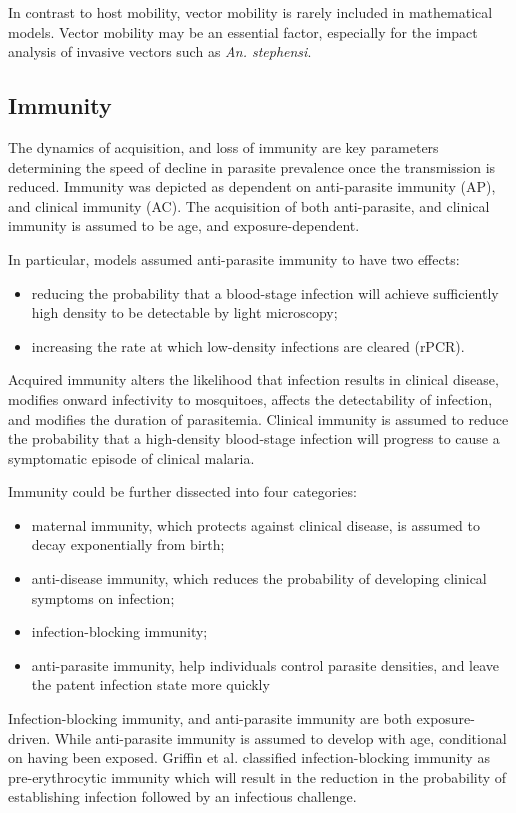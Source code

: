 \documentclass[a4paper, 12pt, twoside]{article}
\begin{document}
In contrast to host mobility, vector mobility is rarely included in mathematical models.
Vector mobility may be an essential factor, especially for the impact analysis of invasive vectors such as \textit{An. stephensi}.

\subsection{Immunity}
The dynamics of acquisition, and loss of immunity are key parameters determining the speed of decline in parasite prevalence once the transmission is reduced.
Immunity was depicted as dependent on anti-parasite immunity (AP), and clinical immunity (AC).
The acquisition of both anti-parasite, and clinical immunity is assumed to be age, and exposure-dependent.

In particular, models assumed anti-parasite immunity to have two effects:
\begin{itemize}
	\item reducing the probability that a blood-stage infection will achieve sufficiently high density to be detectable by light microscopy;
	\item increasing the rate at which low-density infections are cleared (rPCR).
\end{itemize}
Acquired immunity alters the likelihood that infection results in clinical disease, modifies onward infectivity to mosquitoes, affects the detectability of infection, and modifies the duration of parasitemia.
Clinical immunity is assumed to reduce the probability that a high-density blood-stage infection will progress to cause a symptomatic episode of clinical malaria.

Immunity could be further dissected into four categories:
\begin{itemize}
	\item  maternal immunity, which protects against clinical disease, is assumed to decay exponentially from birth;
	\item  anti-disease immunity, which reduces the probability of developing clinical symptoms on infection;
	\item infection-blocking immunity;
	\item anti-parasite immunity, help individuals control parasite densities, and leave the patent infection state more quickly
\end{itemize}
Infection-blocking immunity, and anti-parasite immunity are both exposure-driven.
While anti-parasite immunity is assumed to develop with age, conditional on having been exposed.
Griffin et al.\cite{Griffin2010} classified infection-blocking immunity as pre-erythrocytic immunity which will result in the reduction in the probability of establishing infection followed by an infectious challenge.
\end{document}
